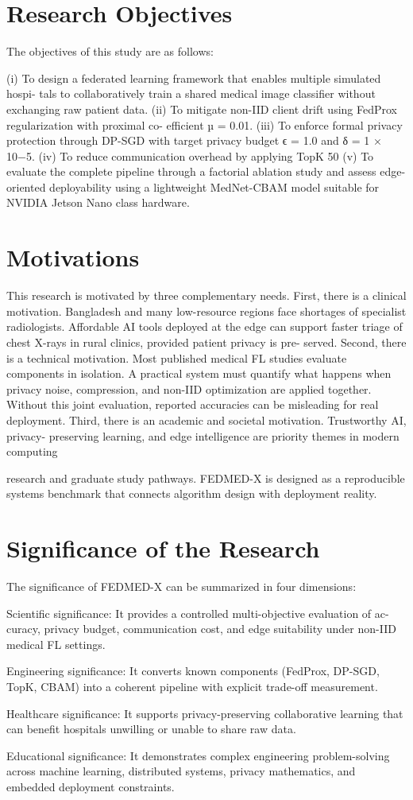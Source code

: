 \section{Research Objectives}
The objectives of this study are as follows:

(i) To design a federated learning framework that enables multiple simulated hospi- tals to collaboratively train a shared medical image classifier without exchanging raw patient data.
(ii) To mitigate non-IID client drift using FedProx regularization with proximal co- efficient µ = 0.01.
(iii) To enforce formal privacy protection through DP-SGD with target privacy budget ϵ = 1.0 and δ = 1 × 10−5.
(iv) To reduce communication overhead by applying TopK 50%
(v) To evaluate the complete pipeline through a factorial ablation study and assess edge-oriented deployability using a lightweight MedNet-CBAM model suitable for
NVIDIA Jetson Nano class hardware.
\section{Motivations}
This research is motivated by three complementary needs.
First, there is a clinical motivation. Bangladesh and many low-resource regions face shortages of specialist radiologists. Affordable AI tools deployed at the edge can support faster triage of chest X-rays in rural clinics, provided patient privacy is pre- served.
Second, there is a technical motivation.
Most published medical FL studies evaluate components in isolation. A practical system must quantify what happens when privacy noise, compression, and non-IID optimization are applied together. Without this joint evaluation, reported accuracies can be misleading for real deployment.
Third, there is an academic and societal motivation. Trustworthy AI, privacy- preserving learning, and edge intelligence are priority themes in modern computing

research and graduate study pathways.
FEDMED-X is designed as a reproducible systems benchmark that connects algorithm design with deployment reality.
\section{Significance of the Research}
The significance of FEDMED-X can be summarized in four dimensions:
\item Scientific significance: It provides a controlled multi-objective evaluation of ac- curacy, privacy budget, communication cost, and edge suitability under non-IID medical FL settings.
\item Engineering significance: It converts known components (FedProx, DP-SGD,
TopK, CBAM) into a coherent pipeline with explicit trade-off measurement.
\item Healthcare significance: It supports privacy-preserving collaborative learning that can benefit hospitals unwilling or unable to share raw data.
\item Educational significance: It demonstrates complex engineering problem-solving across machine learning, distributed systems, privacy mathematics, and embedded deployment constraints.
